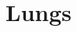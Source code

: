 \section{Lungs}
\label{sec:lung}



\kant[10]


\kant[10]


\kant[10]


\kant[10]


\kant[10]


\kant[10]


\kant[10]


\kant[10]


\kant[10]


\kant[10]
\kant[5]
